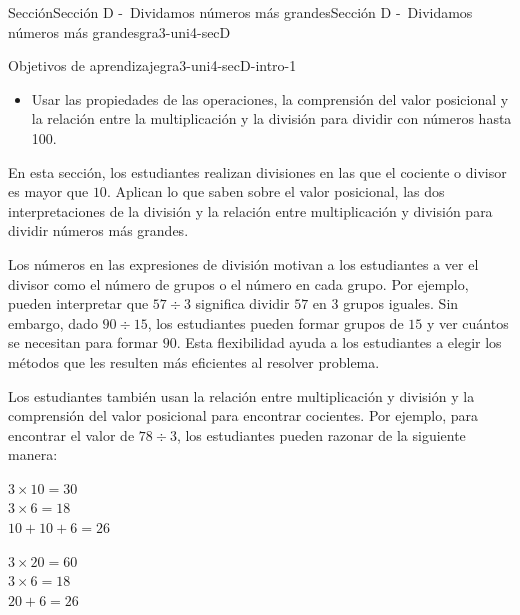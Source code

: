 \documentclass[oneside,10pt,]{article}
\begin{document}
\begin{sectionptx}{Sección}{Sección D -~Dividamos números más grandes}{}{Sección D -~Dividamos números más grandes}{}{}{gra3-uni4-secD}
\begin{introduction}{}%
\begin{objectives}{Objetivos de aprendizaje}{gra3-uni4-secD-intro-1}
%
\begin{itemize}[label=\textbullet]
\item{}Usar las propiedades de las operaciones, la comprensión del valor posicional y la relación entre la multiplicación y la división para dividir con números hasta 100.%
\end{itemize}
\end{objectives}
En esta sección, los estudiantes realizan divisiones en las que el cociente o divisor es mayor que \(10\). Aplican lo que saben sobre el valor posicional, las dos interpretaciones de la división y la relación entre multiplicación y división para dividir números más grandes.%
\par
Los números en las expresiones de división motivan a los estudiantes a ver el divisor como el número de grupos o el número en cada grupo. Por ejemplo, pueden interpretar que \(57 \div 3\) significa dividir \(57\) en \(3\) grupos iguales. Sin embargo, dado \(90 \div 15\), los estudiantes pueden formar grupos de \(15\) y ver cuántos se necesitan para formar \(90\). Esta flexibilidad ayuda a los estudiantes a elegir los métodos que les resulten más eficientes al resolver problema.%
\par
Los estudiantes también usan la relación entre multiplicación y división y la comprensión del valor posicional para encontrar cocientes. Por ejemplo, para encontrar el valor de \(78 \div 3\), los estudiantes pueden razonar de la siguiente manera:%
\begin{sidebyside}{2}{0}{0}{0.2}%
\begin{sbspanel}{0.4}%
\(3 \times 10 = 30\)\\
 \(3 \times 6 = 18\)\\
 \(10 + 10 + 6 = 26\)%
\end{sbspanel}%
\begin{sbspanel}{0.4}%
\par
\(3 \times 20 = 60\)\\
 \(3 \times 6 = 18\)\\
 \(20 + 6 = 26\)%
\end{sbspanel}%
\end{sidebyside}%
\par

\end{introduction}
\end{sectionptx}
\end{document}
